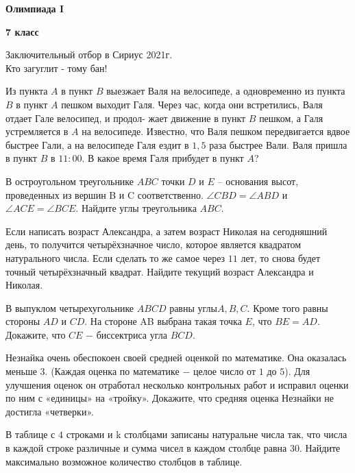 \centerline{\Huge \bf  Олимпиада I}
\centerline{\Huge \bf 7 класс}

\begin{flushright}
    \scriptsize{Заключительный отбор в Сириус 2021г.\\ Кто загуглит - тому бан!}
\end{flushright}

Из пункта $A$ в пункт $B$ выезжает Валя на велосипеде, а одновременно из пункта $B$ в пункт $A$ пешком выходит Галя. Через час, когда они встретились, Валя отдает Гале велосипед, и продол- жает движение в пункт $B$ пешком, а Галя устремляется в $A$ на велосипеде. Известно, что Валя пешком передвигается вдвое быстрее Гали, а на велосипеде Галя ездит в $1,5$ раза быстрее Вали. Валя пришла в пункт $B$ в $11:00$. В какое время Галя прибудет в пункт $A$?

 В остроугольном треугольнике $ABC$ точки $D$ и $E$ $–$ основания высот, проведенных из вершин B и C соответственно. $\angle CBD = \angle ABD$ и $\angle ACE = \angle BCE$. Найдите углы треугольника $ABC$.

 Если написать возраст Александра, а затем возраст Николая на сегодняшний день, то получится четырёхзначное число, которое является квадратом натурального числа. Если сделать то же самое через $11$ лет, то снова будет точный четырёхзначный квадрат. Найдите текущий возраст Александра и Николая.

В выпуклом четырехугольнике $ABCD$ равны углы$ A, B, C$. Кроме того равны стороны $AD$ и $CD$. На стороне AB выбрана такая точка $E$, что $BE = AD.$ Докажите, что $CE$ $-$ биссектриса угла $BCD$.

Незнайка очень обеспокоен своей средней оценкой по математике. Она оказалась меньше $3$. (Каждая оценка по математике $-$ целое число от $1$ до $5$). Для улучшения оценок он отработал несколько контрольных работ и исправил оценки по ним с «единицы» на «тройку». Докажите, что средняя оценка Незнайки не достигла «четверки».

В таблице с $4$ строками и k столбцами записаны натуральне числа так, что числа в каждой строке различные и сумма чисел в каждом столбце равна $30$. Найдите максимально возможное количество столбцов в таблице.